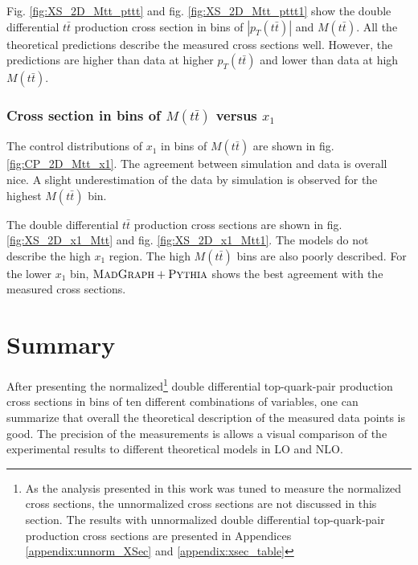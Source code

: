Fig. \ref{fig:XS_2D_Mtt_pttt} and fig. \ref{fig:XS_2D_Mtt_pttt1} show the double differential $t\bar{t}$ production cross section in bins of $|p_{T}(t\bar{t})|$ and $M(t\bar{t})$.
All the theoretical predictions describe the measured cross sections well. However, the predictions are higher than data at higher $p_{T}(t\bar{t})$ and lower than data
at high $M(t\bar{t})$.

% 
% 

\subsubsection{Cross section in bins of $M(t\bar{t})$ versus $x_{1}$}

The control distributions of $x_{1}$ in bins of $M(t\bar{t})$ are shown in fig. \ref{fig:CP_2D_Mtt_x1}. The agreement between simulation and data is overall nice.
A slight underestimation of the data by simulation is observed for the highest $M(t\bar{t})$ bin.

The double differential $t\bar{t}$ production cross sections are shown in fig. \ref{fig:XS_2D_x1_Mtt} and fig. \ref{fig:XS_2D_x1_Mtt1}. The models do not describe the high $x_{1}$ region. The 
high $M(t\bar{t})$ bins are also poorly described. For the lower $x_{1}$ bin, $\textsc{MadGraph}+\textsc{Pythia}$ shows the best agreement with the measured cross sections.


\section{Summary}

After presenting the normalized\footnote{As the analysis presented in this work was tuned to measure the normalized cross sections, the unnormalized cross sections are not
discussed in this section. The results with unnormalized double differential top-quark-pair production cross sections are presented in Appendices \ref{appendix:unnorm_XSec}
and \ref{appendix:xsec_table}} double differential top-quark-pair production cross sections in bins of ten different combinations of variables,
one can summarize that overall the theoretical description of the measured data points is good. The precision of the measurements is allows a visual 
comparison of the experimental results to different theoretical models in LO and NLO.

